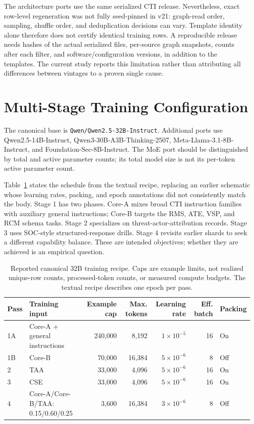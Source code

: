\documentclass[journal]{IEEEtran}
\newcommand{\code}[1]{{\small\nolinkurl{#1}}}
\begin{document}
The architecture ports use the same serialized CTI release. Nevertheless, exact row-level regeneration was not fully seed-pinned in v21: graph-read order, sampling, shuffle order, and deduplication decisions can vary. Template identity alone therefore does not certify identical training rows. A reproducible release needs hashes of the actual serialized files, per-source graph snapshots, counts after each filter, and software/configuration versions, in addition to the templates. The current study reports this limitation rather than attributing all differences between vintages to a proven single cause.

\section{Multi-Stage Training Configuration}\label{sec:training}
The canonical base is \code{Qwen/Qwen2.5-32B-Instruct}. Additional ports use Qwen2.5-14B-Instruct, Qwen3-30B-A3B-Thinking-2507, Meta-Llama-3.1-8B-Instruct, and Foundation-Sec-8B-Instruct. The MoE port should be distinguished by total and active parameter counts; its total model size is not its per-token active parameter count.

Table~\ref{tab:training} states the schedule from the textual recipe, replacing an earlier schematic whose learning rates, packing, and epoch annotations did not consistently match the body. Stage 1 has two phases. Core-A mixes broad CTI instruction families with auxiliary general instructions; Core-B targets the RMS, ATE, VSP, and RCM schema tasks. Stage 2 specializes on threat-actor-attribution records. Stage 3 uses SOC-style structured-response drills. Stage 4 revisits earlier shards to seek a different capability balance. These are intended objectives; whether they are achieved is an empirical question.

\begin{table}[!t]
\centering\small
\caption{Reported canonical 32B training recipe. Caps are example limits, not realized unique-row counts, processed-token counts, or measured compute budgets. The textual recipe describes one epoch per pass.}\label{tab:training}
\begin{tabular}{@{}llrrrrl@{}}
\toprule Pass & Training input & Example cap & Max. tokens & Learning rate & Eff. batch & Packing \\\midrule
1A & Core-A + general instructions & 240,000 & 8,192 & $1\times10^{-5}$ & 16 & On \\
1B & Core-B & 70,000 & 16,384 & $5\times10^{-6}$ & 8 & Off \\
2 & TAA & 33,000 & 4,096 & $5\times10^{-6}$ & 16 & On \\
3 & CSE & 33,000 & 4,096 & $5\times10^{-6}$ & 16 & On \\
4 & Core-A/Core-B/TAA: 0.15/0.60/0.25 & 3,600 & 16,384 & $3\times10^{-6}$ & 8 & Off \\\bottomrule
\end{tabular}
\end{table}
\end{document}
